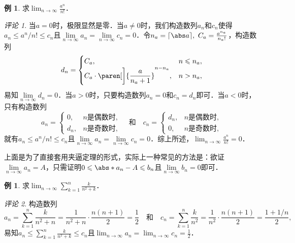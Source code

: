 \documentclass[a4paper,punct=CCT]{ctexbook}
\theoremstyle{definition}
\newtheorem{example}{例}
\newtheorem*{example*}{例}
\theoremstyle{remark}
\newtheorem*{remark}{评论}
\let\leq\leqslant
\let\le\leq
\begin{document}
\begin{example}
  \label{eg:factexp}
  求\(\displaystyle \lim_{n\to\infty} \frac{a^n}{n!}\)．\rule[-2ex]{0ex}{0ex}

  \begin{remark}
    当\(a = 0\)时，极限显然是零．当\(a \ne 0\)时，我们构造数列\(a_n\)和\(c_n\)使得\(a_n \le a^n\!/n! \le c_n\)且\(\lim\limits_{n\to\infty} a_n = \lim\limits_{n\to\infty} c_n = 0\)．令\(n_a = \ceil{\abs a},\ C_a = \frac{a^{n_a}}{n_a!}\)，构造数列
    \begin{equation*}
      d_n =
      \begin{cases}
        C_a, & n \le n_a, \\
        C_a \cdot \paren[\bigg]{\dfrac{a}{n_a + 1}}^{n-n_a}, & n > n_a,
      \end{cases}
    \end{equation*}
    易知\(\lim\limits_{n\to\infty} d_n = 0\)．当\(a > 0\)时，只要构造数列\(a_n = 0\)和\(c_n = d_n\)即可．当\(a < 0\)时，只有构造数列
    \begin{equation*}
      a_n =
      \begin{cases}
        0, & \text{\(n\)是偶数时}, \\
        d_n, & \text{\(n\)是奇数时},
      \end{cases}
      \quad\text{和}\quad
      c_n =
      \begin{cases}
        d_n, & \text{\(n\)是偶数时}, \\
        0, & \text{\(n\)是奇数时},
      \end{cases}
    \end{equation*}
    就有\(a_n \le a^n\!/n! \le c_n\)且\(\lim\limits_{n\to\infty} a_n = \lim\limits_{n\to\infty} c_n = 0\)．综上所述，\(\displaystyle \lim_{n\to\infty} \frac{a^n}{n!} = 0\)．\rule[-2ex]{0ex}{0ex}

    上面是为了直接套用夹逼定理的形式，实际上一种常见的方法是：欲证\(\lim\limits_{n\to\infty} a_n = A\)，只需证明\(0 \le \abs*{a_n - A} \le b_n\)且\(\lim\limits_{n\to\infty} b_n = 0\)即可．
  \end{remark}
\end{example}

\begin{example*}
  求\(\displaystyle \lim_{n\to\infty} \sum_{k=1}^n \frac{k}{n^2+k}\)．

  \begin{remark}
    构造数列
    \begin{equation*}
      a_n
      = \sum_{k=1}^n \frac{k}{n^2 + n}
      = \frac{1}{n^2 + n} \cdot \frac{n(n+1)}{2}
      = \frac12
      \quad\text{和}\quad
      c_n
      = \sum_{k=1}^n \frac{k}{n^2}
      = \frac{1}{n^2} \cdot \frac{n(n+1)}{2}
      = \frac{1 + 1/n}{2},
    \end{equation*}
    易知\(\displaystyle a_n \le \sum\limits_{k=1}^n \frac{k}{n^2+k} \le c_n\)且\(\displaystyle \lim_{n\to\infty} a_n = \lim_{n\to\infty} c_n = \frac12\)．\rule[-3ex]{0ex}{0ex}
  \end{remark}
\end{example*}
\end{document}
